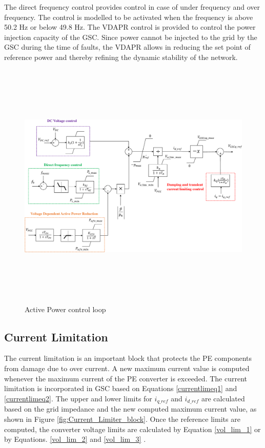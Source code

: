 The direct frequency control provides control in case of under frequency and over frequency. The control is modelled to be activated when the frequency is above 50.2 Hz or below 49.8 Hz.
The VDAPR control is provided to control the power injection capacity of the \gls{GSC}. Since power cannot be injected to the grid by the \gls{GSC} during the time of faults, the VDAPR allows in reducing the set point of reference power and thereby refining the dynamic stability of the network. 
\begin{figure}[H]
\centering
    \includegraphics[height = 12cm,width = \textwidth]{Diagrams/Chapter_3/Active_power_loop_withfreq.pdf}
    \caption{Active Power control loop \cite{korai_dynamic_2019}}
    \label{fig:Active_Power_Control_Loop}
\end{figure}

\subsection{Current Limitation}\label{currentlimitation_RSCAD}
The current limitation is an important block that protects the \gls{PE} components from damage due to over current. A new maximum current value is computed whenever the maximum current of the \gls{PE} converter is exceeded. The current limitation is incorporated in \gls{GSC} based on Equations \ref{currentlimeq1} and \ref{currentlimeq2}. The upper and lower limits for $i_{q\_ref}$ and $i_{d\_ref}$ are calculated based on the grid impedance and the new computed maximum current value, as shown in Figure \ref{fig:Current_Limiter_block}. 
Once the reference limits are computed, the converter voltage limits are calculated by Equation \ref{vol_lim_1} or by Equations. \ref{vol_lim_2} and \ref{vol_lim_3} \cite{korai_dynamic_2019}.

